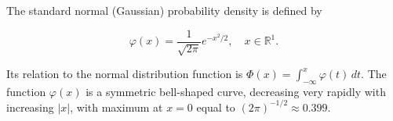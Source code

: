 The standard normal (Gaussian) probability density is defined by

$$\varphi(x) = \frac{1}{\sqrt{2\pi}} e^{-x^2/2}, \quad x \in \mathbb{R}^1.$$

Its relation to the normal distribution function is $\Phi(x) = \int_{-\infty}^x \varphi(t) \, dt$. The function $\varphi(x)$ is a symmetric bell-shaped curve, decreasing very rapidly with increasing $|x|$, with maximum at $x = 0$ equal to $(2\pi)^{-1/2} \approx 0.399$.
